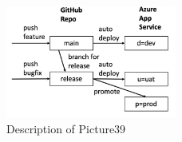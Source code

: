 \documentclass[runningheads]{llncs}
\begin{document}
\begin{figure}[h]
    \centering
    \includegraphics[width=0.5\textwidth]{Pictures/Picture39.jpg}
    \caption{Description of Picture39}
    \label{fig:picture39}
\end{figure}


 
\end{document}
